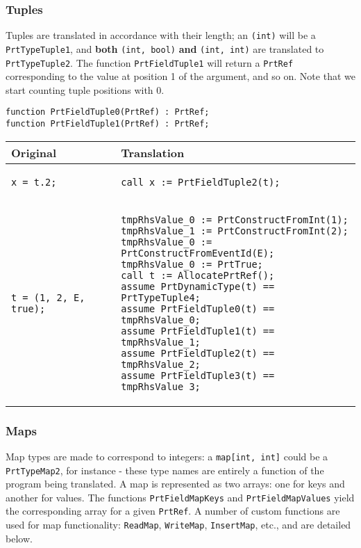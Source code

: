 \documentclass{llncs}
\providecommand{\tabularnewline}{\\}
\begin{document}
\subsubsection{Tuples}
Tuples are translated in accordance with their length; an \texttt{(int)} will be a \texttt{PrtTypeTuple1}, and \textbf{both} \texttt{(int, bool)} \textbf{and} \texttt{(int, int)} are translated to \texttt{PrtTypeTuple2}.
The function \texttt{PrtFieldTuple1} will return a \texttt{PrtRef} corresponding to the value at position 1 of the argument, and so on. Note that we start counting tuple positions with 0.
\begin{verbatim}
function PrtFieldTuple0(PrtRef) : PrtRef;
function PrtFieldTuple1(PrtRef) : PrtRef;
\end{verbatim}
\begin{center}
\begin{tabular}{|p{}|p{}|}
\hline
\textbf{Original} & \textbf{Translation}
\tabularnewline
\hline
\hline
\begin{verbatim}
x = t.2;
\end{verbatim}
&
\begin{verbatim}
call x := PrtFieldTuple2(t);
\end{verbatim}
\tabularnewline
\hline
\begin{verbatim}
t = (1, 2, E, true);
\end{verbatim}
&
\begin{verbatim}
tmpRhsValue_0 := PrtConstructFromInt(1);
tmpRhsValue_1 := PrtConstructFromInt(2);
tmpRhsValue_0 := PrtConstructFromEventId(E);
tmpRhsValue_0 := PrtTrue;
call t := AllocatePrtRef();
assume PrtDynamicType(t) == PrtTypeTuple4;
assume PrtFieldTuple0(t) == tmpRhsValue_0;
assume PrtFieldTuple1(t) == tmpRhsValue_1;
assume PrtFieldTuple2(t) == tmpRhsValue_2;
assume PrtFieldTuple3(t) == tmpRhsValue_3;
\end{verbatim}
\tabularnewline
\hline
\end{tabular}
\end{center}

\subsubsection{Maps}
Map types are made to correspond to integers: a \texttt{map[int, int]} could be a \texttt{PrtTypeMap2}, for instance - these type names are entirely a function of the program being translated. A map is represented as two arrays: one for keys and another for values. The functions \texttt{PrtFieldMapKeys} and \texttt{PrtFieldMapValues} yield the corresponding array for a given \texttt{PrtRef}. A number of custom functions are used for map functionality: \texttt{ReadMap}, \texttt{WriteMap}, \texttt{InsertMap}, etc., and are detailed below.
\end{document}
